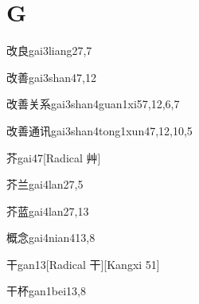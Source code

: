 
\section*{G}

\begin{verbete}{改良}{gai3liang2}{7,7}
\end{verbete}

\begin{verbete}{改善}{gai3shan4}{7,12}
\end{verbete}

\begin{verbete}{改善关系}{gai3shan4guan1xi5}{7,12,6,7}
\end{verbete}

\begin{verbete}{改善通讯}{gai3shan4tong1xun4}{7,12,10,5}
\end{verbete}

\begin{verbete}{芥}{gai4}{7}[Radical 艸]
\end{verbete}

\begin{verbete}{芥兰}{gai4lan2}{7,5}
\end{verbete}

\begin{verbete}{芥蓝}{gai4lan2}{7,13}
\end{verbete}

\begin{verbete}{概念}{gai4nian4}{13,8}
\end{verbete}

\begin{verbete}{干}{gan1}{3}[Radical 干][Kangxi 51]
\end{verbete}

\begin{verbete}{干杯}{gan1bei1}{3,8}
\end{verbete}

